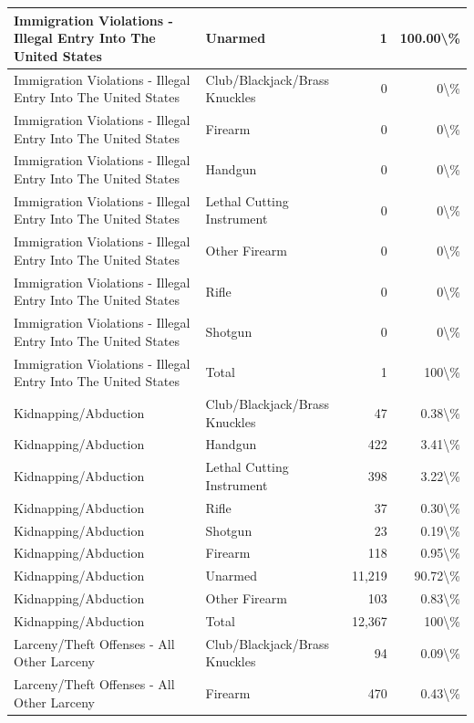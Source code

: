 \documentclass[
]{krantz}
\begin{document}
\begin{longtable}[t]{l|l|r|r}
\hline
Immigration Violations - Illegal Entry Into The United States & Unarmed & 1 & 100.00\textbackslash{}\%\\
\hline
Immigration Violations - Illegal Entry Into The United States & Club/Blackjack/Brass Knuckles & 0 & 0\textbackslash{}\%\\
\hline
Immigration Violations - Illegal Entry Into The United States & Firearm & 0 & 0\textbackslash{}\%\\
\hline
Immigration Violations - Illegal Entry Into The United States & Handgun & 0 & 0\textbackslash{}\%\\
\hline
Immigration Violations - Illegal Entry Into The United States & Lethal Cutting Instrument & 0 & 0\textbackslash{}\%\\
\hline
Immigration Violations - Illegal Entry Into The United States & Other Firearm & 0 & 0\textbackslash{}\%\\
\hline
Immigration Violations - Illegal Entry Into The United States & Rifle & 0 & 0\textbackslash{}\%\\
\hline
Immigration Violations - Illegal Entry Into The United States & Shotgun & 0 & 0\textbackslash{}\%\\
\hline
Immigration Violations - Illegal Entry Into The United States & Total & 1 & 100\textbackslash{}\%\\
\hline
Kidnapping/Abduction & Club/Blackjack/Brass Knuckles & 47 & 0.38\textbackslash{}\%\\
\hline
Kidnapping/Abduction & Handgun & 422 & 3.41\textbackslash{}\%\\
\hline
Kidnapping/Abduction & Lethal Cutting Instrument & 398 & 3.22\textbackslash{}\%\\
\hline
Kidnapping/Abduction & Rifle & 37 & 0.30\textbackslash{}\%\\
\hline
Kidnapping/Abduction & Shotgun & 23 & 0.19\textbackslash{}\%\\
\hline
Kidnapping/Abduction & Firearm & 118 & 0.95\textbackslash{}\%\\
\hline
Kidnapping/Abduction & Unarmed & 11,219 & 90.72\textbackslash{}\%\\
\hline
Kidnapping/Abduction & Other Firearm & 103 & 0.83\textbackslash{}\%\\
\hline
Kidnapping/Abduction & Total & 12,367 & 100\textbackslash{}\%\\
\hline
Larceny/Theft Offenses - All Other Larceny & Club/Blackjack/Brass Knuckles & 94 & 0.09\textbackslash{}\%\\
\hline
Larceny/Theft Offenses - All Other Larceny & Firearm & 470 & 0.43\textbackslash{}\%\\

\end{longtable}
\end{document}
